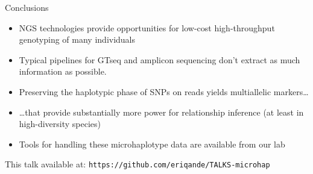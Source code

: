 \documentclass[letter,graphicx]{beamer}
\begin{document}
\begin{frame}{Conclusions}
\begin{itemize}
\item NGS technologies provide opportunities for low-cost high-throughput
genotyping of many individuals
\item Typical pipelines for GTseq and amplicon sequencing don't extract as
much information as possible.
\item Preserving the haplotypic phase of SNPs on reads yields multiallelic markers\ldots
\item \ldots that provide substantially more power for relationship inference
(at least in high-diversity species)
\item Tools for handling these microhaplotype data are available from our lab
\end{itemize}


This talk available at:
{\tt https://github.com/eriqande/TALKS-microhap}
\end{frame}
\end{document}
